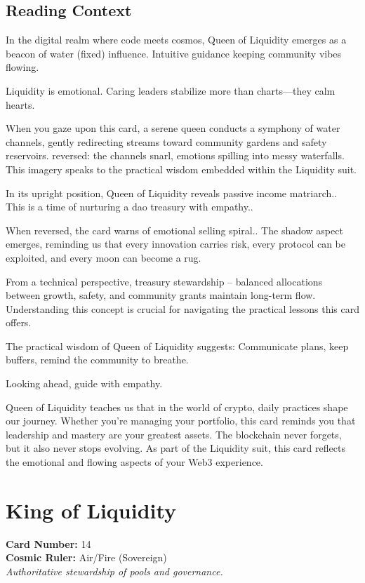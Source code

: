 \documentclass[11pt,oneside]{book}
\begin{document}
\begin{minipage}[t]{0.55\textwidth}
  \subsection*{Reading Context}
  In the digital realm where code meets cosmos, Queen of Liquidity emerges as a beacon of water (fixed) influence. Intuitive guidance keeping community vibes flowing.

  Liquidity is emotional. Caring leaders stabilize more than charts—they calm hearts.

  When you gaze upon this card, a serene queen conducts a symphony of water channels, gently redirecting streams toward community gardens and safety reservoirs. reversed: the channels snarl, emotions spilling into messy waterfalls. This imagery speaks to the practical wisdom embedded within the Liquidity suit.

  In its upright position, Queen of Liquidity reveals passive income matriarch.. This is a time of nurturing a dao treasury with empathy..

  When reversed, the card warns of emotional selling spiral.. The shadow aspect emerges, reminding us that every innovation carries risk, every protocol can be exploited, and every moon can become a rug.

  From a technical perspective, treasury stewardship – balanced allocations between growth, safety, and community grants maintain long-term flow. Understanding this concept is crucial for navigating the practical lessons this card offers.

  The practical wisdom of Queen of Liquidity suggests: Communicate plans, keep buffers, remind the community to breathe.

  Looking ahead, guide with empathy.

  Queen of Liquidity teaches us that in the world of crypto, daily practices shape our journey. Whether you're managing your portfolio, this card reminds you that leadership and mastery are your greatest assets. The blockchain never forgets, but it also never stops evolving. As part of the Liquidity suit, this card reflects the emotional and flowing aspects of your Web3 experience.

\end{minipage}

\newpage
\section*{King of Liquidity}

\begin{minipage}[t]{0.55\textwidth}
  \vspace{0pt}
  \textbf{Card Number:} 14\\  \textbf{Cosmic Ruler:} Air/Fire (Sovereign)\\  \textit{Authoritative stewardship of pools and governance.}
\end{minipage}
\end{document}
